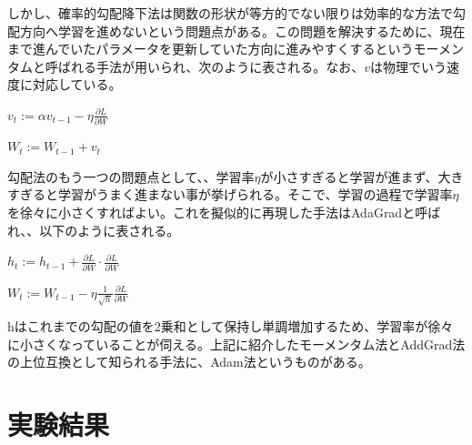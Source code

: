 \documentclass{article}
\begin{document}
しかし、確率的勾配降下法は関数の形状が等方的でない限りは効率的な方法で勾配方向へ学習を進めないという問題点がある。この問題を解決するために、現在まで進んでいたパラメータを更新していた方向に進みやすくするというモーメンタムと呼ばれる手法が用いられ、次のように表される。なお、\begin{math}v\end{math}は物理でいう速度に対応している。


\begin{center}
\begin{math}
v_t := \alpha v_{t-1} - \eta  \frac{\partial L}{\partial W}
\end{math}
\end{center}

\begin{center}
\begin{math}
W_t := W_{t-1} + v_t
\end{math}
\end{center}


勾配法のもう一つの問題点として、、学習率\begin{math}\eta\end{math}が小さすぎると学習が進まず、大きすぎると学習がうまく進まない事が挙げられる。そこで、学習の過程で学習率\begin{math}\eta\end{math}を徐々に小さくすればよい。これを擬似的に再現した手法はAdaGradと呼ばれ、、以下のように表される。


\begin{center}
\begin{math}
h_t := h_{t-1} +  \frac{\partial L}{\partial W} \cdot \frac{\partial L}{\partial W}
\end{math}
\end{center}


\begin{center}
\begin{math}
W_t := W_{t-1} - \eta \frac{1}{\sqrt{h}} \frac{\partial L}{\partial W}
\end{math}
\end{center}

hはこれまでの勾配の値を2乗和として保持し単調増加するため、学習率が徐々に小さくなっていることが伺える。上記に紹介したモーメンタム法とAddGrad法の上位互換として知られる手法に、Adam法というものがある。

\newpage
\section{実験結果}
\end{document}
